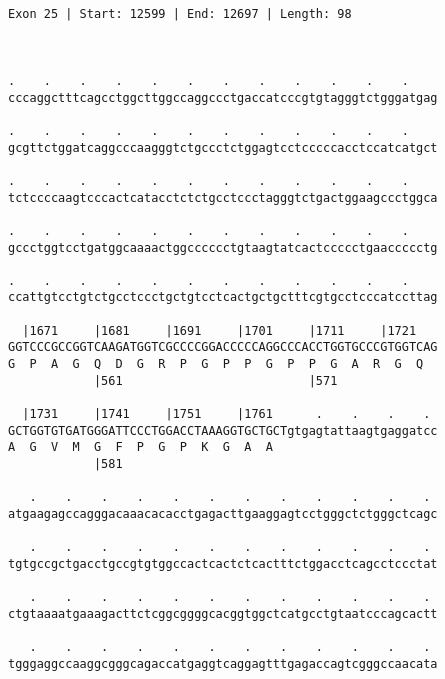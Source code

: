 \documentclass{article}
\begin{document}
\begin{Verbatim}
                                                       
 
Exon 25 | Start: 12599 | End: 12697 | Length: 98



.    .    .    .    .    .    .    .    .    .    .    .    
cccaggctttcagcctggcttggccaggccctgaccatcccgtgtagggtctgggatgag
                                                            
.    .    .    .    .    .    .    .    .    .    .    .    
gcgttctggatcaggcccaagggtctgccctctggagtcctcccccacctccatcatgct
                                                            
.    .    .    .    .    .    .    .    .    .    .    .    
tctccccaagtcccactcatacctctctgcctccctagggtctgactggaagccctggca
                                                            
.    .    .    .    .    .    .    .    .    .    .    .    
gccctggtcctgatggcaaaactggcccccctgtaagtatcactccccctgaaccccctg
                                                            
.    .    .    .    .    .    .    .    .    .    .    .    
ccattgtcctgtctgcctccctgctgtcctcactgctgctttcgtgcctcccatccttag
                                                            
  |1671     |1681     |1691     |1701     |1711     |1721   
GGTCCCGCCGGTCAAGATGGTCGCCCCGGACCCCCAGGCCCACCTGGTGCCCGTGGTCAG
G  P  A  G  Q  D  G  R  P  G  P  P  G  P  P  G  A  R  G  Q  
            |561                          |571              
  
  |1731     |1741     |1751     |1761      .    .    .    . 
GCTGGTGTGATGGGATTCCCTGGACCTAAAGGTGCTGCTgtgagtattaagtgaggatcc
A  G  V  M  G  F  P  G  P  K  G  A  A                       
            |581                                            
  
   .    .    .    .    .    .    .    .    .    .    .    . 
atgaagagccagggacaaacacacctgagacttgaaggagtcctgggctctgggctcagc
                                                            
   .    .    .    .    .    .    .    .    .    .    .    . 
tgtgccgctgacctgccgtgtggccactcactctcactttctggacctcagcctccctat
                                                            
   .    .    .    .    .    .    .    .    .    .    .    . 
ctgtaaaatgaaagacttctcggcggggcacggtggctcatgcctgtaatcccagcactt
                                                            
   .    .    .    .    .    .    .    .    .    .    .    . 
tgggaggccaaggcgggcagaccatgaggtcaggagtttgagaccagtcgggccaacata
                                                            

\end{Verbatim}
\end{document}
